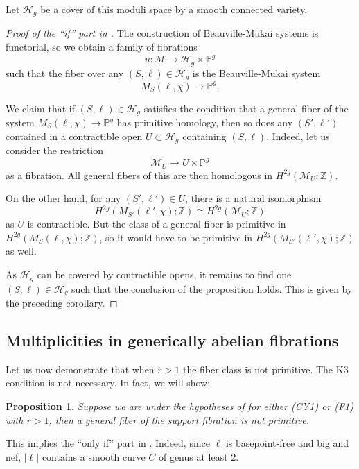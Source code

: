 \documentclass{amsart}
\theoremstyle{plain}
\newtheorem{proposition}[theorem]{Proposition}
\theoremstyle{definition}
\theoremstyle{remark}
\begin{document}
Let $\mathcal H_g$ be a cover of this moduli space by a smooth connected variety.
\begin{proof}[Proof of the ``if'' part in ]
    The construction of Beauville-Mukai systems is functorial, so we obtain a family of fibrations
    \[u:\mathcal M\to\mathcal H_g\times\mathbb P^g\]
    such that the fiber over any $(S,\ell)\in\mathcal H_g$ is the Beauville-Mukai system
    \[M_S(\ell,\chi)\to\mathbb P^g.\]

    We claim that if $(S,\ell)\in\mathcal H_g$ satisfies the condition that a general fiber of the system $M_S(\ell,\chi)\to\mathbb P^g$ has primitive homology, then so does any $(S',\ell')$ contained in a contractible open $U\subset\mathcal H_g$ containing $(S,\ell)$.
    Indeed, let us consider the restriction
    \[\mathcal M_U\to U\times\mathbb P^g\]
    as a fibration.
    All general fibers of this are then homologous in $H^{2g}(\mathcal M_U;\mathbb Z)$.

    On the other hand, for any $(S',\ell')\in U$, there is a natural isomorphism
    \[H^{2g}(M_{S'}(\ell',\chi);\mathbb Z)\cong H^{2g}(\mathcal M_U;\mathbb Z)\]
    as $U$ is contractible.
    But the class of a general fiber is primitive in $H^{2g}(M_S(\ell,\chi);\mathbb Z)$, so it would have to be primitive in $H^{2g}(M_{S'}(\ell',\chi);\mathbb Z)$ as well.

    As $\mathcal H_g$ can be covered by contractible opens, it remains to find one $(S,\ell)\in\mathcal H_g$ such that the conclusion of the proposition holds.
    This is given by the preceding corollary.
\end{proof}
\subsection{Multiplicities in generically abelian fibrations}
Let us now demonstrate that when $r>1$ the fiber class is not primitive.
The K3 condition is not necessary.
In fact, we will show:
\begin{proposition}\label{prop:nonprimfibers}
    Suppose we are under the hypotheses of  for either (CY1) or (F1) with $r>1$, then a general fiber of the support fibration is not primitive.
\end{proposition}
This implies the ``only if'' part in .
Indeed, since $\ell$ is basepoint-free and big and nef, $|\ell|$ contains a smooth curve $C$ of genus at least $2$.
\end{document}
